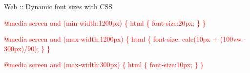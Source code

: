 \documentclass[8pt,xcolor={svgnames, x11names}]{beamer}
\begin{document}
\begin{frame}{Web :: Dynamic font sizes with CSS}
\begin{textblock*}{1\textwidth}
{\begin{enumerate}
{					\textcolor{red}{\ttfamily @media screen and (min-width:1200px) \{ \newline
					html \{ font-size:20px; \} \newline\} } \pars

					\textcolor{red}{\ttfamily @media screen and (max-width:1200px) \{ \newline
						html \{ font-size: calc(10px + (100vw - 300px)/90); \} \newline \} } \pars

					\textcolor{red}{\ttfamily @media screen and (max-width:300px) \{ \newline
						html \{ font-size:10px; \} \newline\} } 
				}					 			
			\end{enumerate}			
		}

	\end{textblock*}

	

	


		

	
\end{frame}
\end{document}
